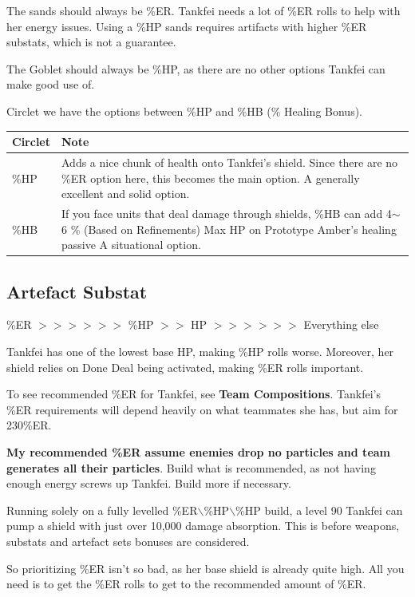 \documentclass[11pt]{article}
\begin{document}
The sands should always be \%ER. Tankfei needs a lot of \%ER rolls to help with her energy issues. Using a \%HP sands requires artifacts with higher \%ER substats, which is not a guarantee. 

The Goblet should always be \%HP, as there are no other options Tankfei can make good use of.

Circlet we have the options between \%HP and \%HB (\% Healing Bonus).

\begin{tabular}{|m{}|m{}|}
\hline Circlet  & Note \\ 
\hline \%HP & Adds a nice chunk of health onto Tankfei's shield. Since there are no \%ER option here, this becomes the main option. A generally excellent and solid option. \\
\hline \%HB & If you face units that deal damage through shields, \%HB can add 4$\sim$6 \% (Based on Refinements) Max HP on Prototype Amber's healing passive A situational option. \\
\hline
\end{tabular}

\subsection{Artefact Substat}

\begin{center}
    \%ER $>>>>>>$ \%HP $>>$ HP $>>>>>>$ Everything else
\end{center} Tankfei has one of the lowest base HP, making \%HP rolls worse. Moreover, her shield relies on Done Deal being activated, making \%ER rolls important.

To see recommended \%ER for Tankfei, see \textbf{Team Compositions}. Tankfei's \%ER requirements will depend heavily on what teammates she has, but aim for 230\%ER.

\textbf{My recommended \%ER assume enemies drop no particles and team generates all their particles}. Build what is recommended, as not having enough energy screws up Tankfei. Build more if necessary.  

Running solely on a fully levelled \%ER$\backslash$\%HP$\backslash$\%HP build, a level 90 Tankfei can pump a shield with just over 10,000 damage absorption. This is before weapons, substats and artefact sets bonuses are considered.  

So prioritizing \%ER isn't so bad, as her base shield is already quite high. All you need is to get the \%ER rolls to get to the recommended amount of \%ER.
\end{document}
